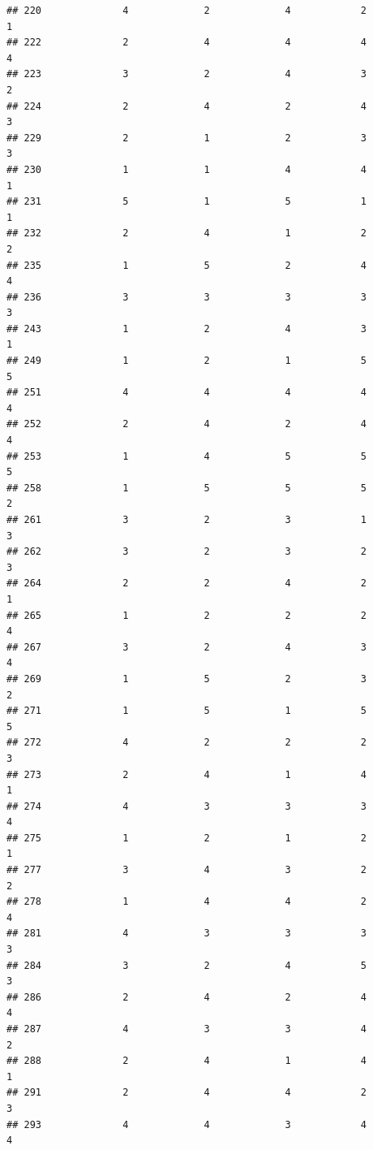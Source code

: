 \documentclass[
]{article}
\begin{document}
\begin{verbatim}
## 220              4             2             4            2          1
## 222              2             4             4            4          4
## 223              3             2             4            3          2
## 224              2             4             2            4          3
## 229              2             1             2            3          3
## 230              1             1             4            4          1
## 231              5             1             5            1          1
## 232              2             4             1            2          2
## 235              1             5             2            4          4
## 236              3             3             3            3          3
## 243              1             2             4            3          1
## 249              1             2             1            5          5
## 251              4             4             4            4          4
## 252              2             4             2            4          4
## 253              1             4             5            5          5
## 258              1             5             5            5          2
## 261              3             2             3            1          3
## 262              3             2             3            2          3
## 264              2             2             4            2          1
## 265              1             2             2            2          4
## 267              3             2             4            3          4
## 269              1             5             2            3          2
## 271              1             5             1            5          5
## 272              4             2             2            2          3
## 273              2             4             1            4          1
## 274              4             3             3            3          4
## 275              1             2             1            2          1
## 277              3             4             3            2          2
## 278              1             4             4            2          4
## 281              4             3             3            3          3
## 284              3             2             4            5          3
## 286              2             4             2            4          4
## 287              4             3             3            4          2
## 288              2             4             1            4          1
## 291              2             4             4            2          3
## 293              4             4             3            4          4

\end{verbatim}
\end{document}
